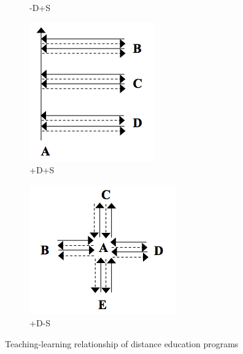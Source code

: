 \begin{figure}[!hbt]
\begin{subfigure}{0.285\textwidth}
  \caption{-D+S}
    \end{subfigure}
    \begin{subfigure}{0.285\textwidth}
        \includegraphics[width=\textwidth]{tdt1c}
        \caption{+D+S}
    \end{subfigure}\hspace{0.15\textwidth}
\begin{subfigure}{0.36\textwidth}
        \includegraphics[width=\textwidth]{tdt1d}
        \caption{+D-S}
    \end{subfigure}
    \caption{Teaching-learning relationship of distance education programs \cite{moore1983individual}}
\end{figure}

